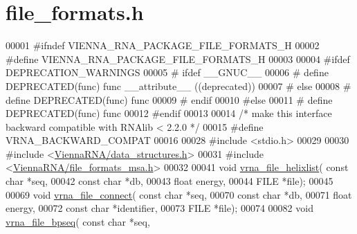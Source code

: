 \hypertarget{file__formats_8h_source}{}\section{file\+\_\+formats.\+h}
\label{file__formats_8h_source}

\begin{DoxyCode}
00001 \textcolor{preprocessor}{#ifndef VIENNA\_RNA\_PACKAGE\_FILE\_FORMATS\_H}
00002 \textcolor{preprocessor}{#define VIENNA\_RNA\_PACKAGE\_FILE\_FORMATS\_H}
00003 
00004 \textcolor{preprocessor}{#ifdef DEPRECATION\_WARNINGS}
00005 \textcolor{preprocessor}{# ifdef \_\_GNUC\_\_}
00006 \textcolor{preprocessor}{#  define DEPRECATED(func) func \_\_attribute\_\_ ((deprecated))}
00007 \textcolor{preprocessor}{# else}
00008 \textcolor{preprocessor}{#  define DEPRECATED(func) func}
00009 \textcolor{preprocessor}{# endif}
00010 \textcolor{preprocessor}{#else}
00011 \textcolor{preprocessor}{# define DEPRECATED(func) func}
00012 \textcolor{preprocessor}{#endif}
00013 
00014 \textcolor{comment}{/* make this interface backward compatible with RNAlib < 2.2.0 */}
00015 \textcolor{preprocessor}{#define VRNA\_BACKWARD\_COMPAT}
00016 
00028 \textcolor{preprocessor}{#include <stdio.h>}
00029 
00030 \textcolor{preprocessor}{#include <\hyperlink{data__structures_8h}{ViennaRNA/data\_structures.h}>}
00031 \textcolor{preprocessor}{#include <\hyperlink{file__formats__msa_8h}{ViennaRNA/file\_formats\_msa.h}>}
00032 
00041 \textcolor{keywordtype}{void} \hyperlink{group__file__utils_gaaface7db12fadc3d271641c4515ab6e4}{vrna\_file\_helixlist}( \textcolor{keyword}{const} \textcolor{keywordtype}{char} *seq,
00042                           \textcolor{keyword}{const} \textcolor{keywordtype}{char} *db,
00043                           \textcolor{keywordtype}{float} energy,
00044                           FILE *file);
00045 
00069 \textcolor{keywordtype}{void} \hyperlink{file__formats_8h_ab69682373ccca1e0e28cc967eec07745}{vrna\_file\_connect}( \textcolor{keyword}{const} \textcolor{keywordtype}{char} *seq,
00070                         \textcolor{keyword}{const} \textcolor{keywordtype}{char} *db,
00071                         \textcolor{keywordtype}{float} energy,
00072                         \textcolor{keyword}{const} \textcolor{keywordtype}{char} *identifier,
00073                         FILE *file);
00074 
00082 \textcolor{keywordtype}{void} \hyperlink{file__formats_8h_a9b462e6f202594af5d3fa56e280d633f}{vrna\_file\_bpseq}( \textcolor{keyword}{const} \textcolor{keywordtype}{char} *seq,

\end{DoxyCode}
